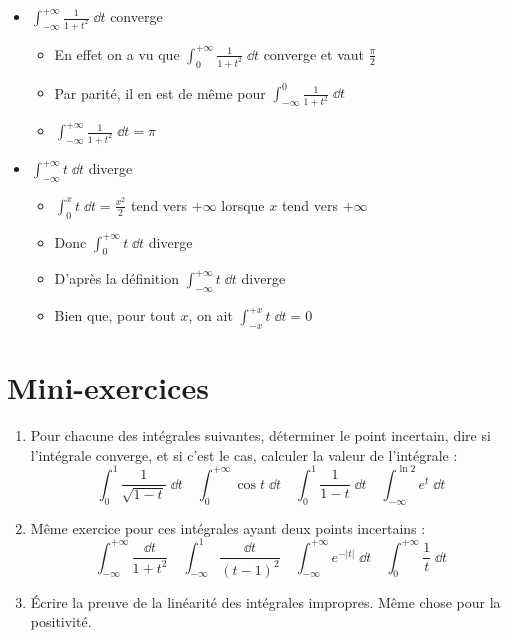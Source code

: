 \begin{frame}
\begin{exemple}
\begin{itemize}
\item $ \int_{-\infty}^{+\infty} \frac{1}{1+t^2}\;\dd t$ converge
\pause
\begin{itemize}
  \item En effet on a vu que $ \int_0^{+\infty} \frac{1}{1+t^2}\;\dd t$ converge
  et vaut $\frac{\pi}{2}$
 \pause 
  \item Par parité, il en est de même pour $\int_{-\infty}^0 \frac{1}{1+t^2}\;\dd t$
  \pause
  \item $ \int_{-\infty}^{+\infty} \frac{1}{1+t^2}\;\dd t = \pi$
\end{itemize}
\bigskip
\pause
\item $\int_{-\infty}^{+\infty}t\;\dd t$ diverge
\pause
\begin{itemize}
  \item $\int_{0}^{x} t\;\dd t = \frac{x^2}{2}$ tend vers $+\infty$ 
lorsque $x$ tend vers  $+\infty$
  \pause
  \item Donc $\int_0^{+\infty}t\;\dd t$ diverge
  \pause
  \item D'après la définition $\int_{-\infty}^{+\infty}t\;\dd t$ diverge
  \pause
  \item Bien que, pour tout $x$, on ait $\int_{-x}^{+x} t\;\dd t=0$
\end{itemize}
\end{itemize}
\end{exemple}
\end{frame}


 \section*{Mini-exercices}

\begin{frame}
\begin{miniexercice}
\begin{enumerate}
  \item Pour chacune des intégrales suivantes, déterminer le point incertain, dire
  si l'intégrale converge, et si c'est le cas, calculer la valeur de l'intégrale :
  $$
  \int_0^1 \frac{1}{\sqrt {1-t}} \;\dd t \quad
  \int_0^{+\infty}\cos t \;\dd t \quad
  \int_0^1 \frac{1}{1-t} \;\dd t \quad
  \int_{-\infty}^{\ln 2} e^t \;\dd t
  $$
  
  \item Même exercice pour ces intégrales ayant deux points incertains :
  $$
  \int_{-\infty}^{+\infty} \frac{\dd t}{1+t^2} \quad
  \int_{-\infty}^{1} \frac{\dd t}{(t-1)^2} \quad
  \int_{-\infty}^{+\infty} e^{-|t|}\;\dd t \quad
  \int_0^{+\infty} \frac1t \;\dd t$$
  
   \item \'Ecrire la preuve de la linéarité des intégrales impropres. Même chose 
   pour la positivité.  
\end{enumerate}
\end{miniexercice}
\end{frame}





